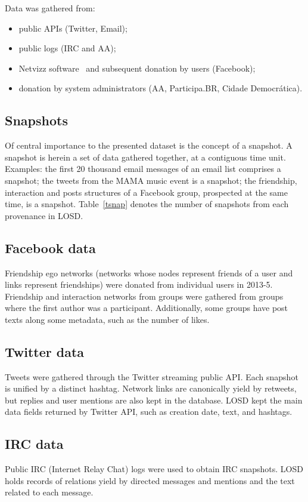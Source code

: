 \documentclass[data,datadescriptor,submit,moreauthors,pdftex]{Definitions/mdpi}
\begin{document}
\noindent Data was gathered from:
\begin{itemize}
    \item public APIs (Twitter, Email);
    \item public logs (IRC and AA);
    \item Netvizz software~\cite{netvizz} and subsequent donation by users (Facebook);
    \item donation by system administrators (AA, Participa.BR, Cidade Democr\'atica).
\end{itemize}

\subsection{Snapshots}
Of central importance to the presented dataset is the concept of a snapshot.
A snapshot is herein a set of data gathered together, at a contiguous time
unit.
Examples: the first 20 thousand email messages of an email list
comprises a snapshot; the tweets from the MAMA music event is a
snapshot; the friendship, interaction and posts structures of a Facebook
group, prospected at the same time, is a snapshot.
Table~\ref{tsnap} denotes the number of snapshots from each provenance in LOSD.



\subsection{Facebook data}
Friendship ego networks (networks whose nodes represent friends of a user and links represent friendships)
were donated from individual users in 2013-5.
Friendship and interaction networks from groups were gathered from
groups where the first author was a participant.
Additionally, some groups have post texts along some metadata, such as
the number of likes.

\subsection{Twitter data}
Tweets were gathered through the Twitter streaming public API.
Each snapshot is unified by a distinct hashtag.
Network links are canonically yield by retweets,
but replies and user mentions are also kept in the database.
LOSD kept the main data fields returned by Twitter API,
such as creation date, text, and hashtags.

\subsection{IRC data}
Public IRC (Internet Relay Chat) logs were used to obtain IRC snapshots.
LOSD holds records of relations yield by directed messages and
mentions and the text related to each message.
\end{document}
